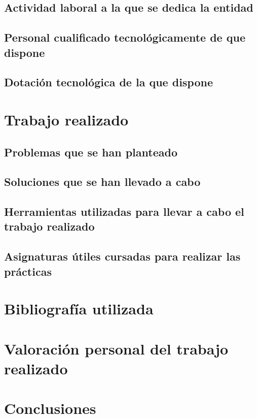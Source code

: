 \documentclass{article}
\begin{document}
\subsection{Actividad laboral a la que se dedica la entidad}

\subsection{Personal cualificado tecnológicamente de que dispone}

\subsection{Dotación tecnológica de la que dispone}

\section{Trabajo realizado}

\subsection{Problemas que se han planteado}

\subsection{Soluciones que se han llevado a cabo}

\subsection{Herramientas utilizadas para llevar a cabo el trabajo realizado}

\subsection{Asignaturas útiles cursadas para realizar las prácticas}

\section{Bibliografía utilizada}

\section{Valoración personal del trabajo realizado}

\section{Conclusiones}
\end{document}

